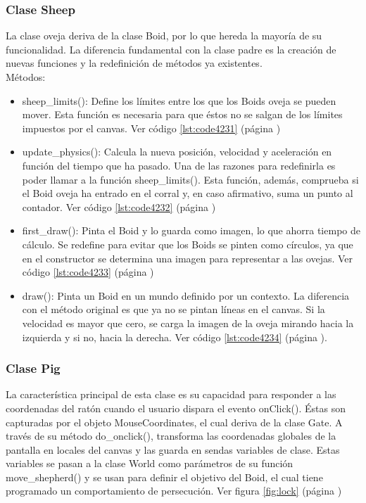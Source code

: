 \subsubsection{Clase Sheep}
\label{subsubsection:sheep}

La clase oveja deriva de la clase Boid, por lo que hereda la mayoría de su funcionalidad. La diferencia fundamental con la clase padre es 
la creación de nuevas funciones y la redefinición de métodos ya existentes.\\

Métodos:
\begin{itemize}
\item sheep\_limits(): Define los límites entre los que los Boids oveja se pueden mover. Esta función es necesaria para que éstos no se 
salgan de los límites impuestos por el canvas. Ver código \ref{lst:code4231} (página \pageref{lst:code4231})

\item  update\_physics(): Calcula la nueva posición, velocidad y aceleración en función del tiempo que ha pasado. Una de las razones para 
redefinirla es poder llamar a la función sheep\_limits(). Esta función, además, comprueba si el Boid oveja ha entrado en el corral y, en 
caso afirmativo, suma un punto al contador. Ver código \ref{lst:code4232} (página \pageref{lst:code4232})

\item  first\_draw():  Pinta el Boid y lo guarda como imagen, lo que ahorra tiempo de cálculo. Se redefine para evitar que los Boids se 
pinten como círculos, ya que en el constructor se determina una imagen para representar a las ovejas. Ver código \ref{lst:code4233} (página \pageref{lst:code4233})

\item  draw(): Pinta un Boid en un mundo definido por un contexto. La diferencia con el método original es que ya no se pintan líneas en 
el canvas. Si la velocidad es mayor que cero, se carga la imagen de la oveja mirando hacia la izquierda y si no, hacia la derecha. 
Ver código \ref{lst:code4234} (página \pageref{lst:code4234}).

\end{itemize}



\subsubsection{Clase Pig}
\label{subsubsection:pig}

La característica principal de esta clase es su capacidad para responder a las coordenadas del ratón cuando el usuario dispara el evento 
onClick(). Éstas son capturadas por el objeto MouseCoordinates, el cual deriva de la clase Gate. A través de su método do\_onclick(), 
transforma las coordenadas globales de la pantalla en locales del canvas y las guarda en sendas variables de clase. Estas variables se 
pasan a la clase World como parámetros de su función move\_shepherd() y se usan para definir el objetivo del Boid, el cual tiene programado un 
comportamiento de persecución. Ver figura \ref{fig:lock} (página \pageref{fig:lock})\\ 

